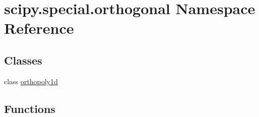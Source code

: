 \hypertarget{namespacescipy_1_1special_1_1orthogonal}{}\section{scipy.\+special.\+orthogonal Namespace Reference}
\label{namespacescipy_1_1special_1_1orthogonal}
\subsection*{Classes}
\begin{DoxyCompactItemize}
\item 
class \hyperlink{classscipy_1_1special_1_1orthogonal_1_1orthopoly1d}{orthopoly1d}
\end{DoxyCompactItemize}
\subsection*{Functions}
